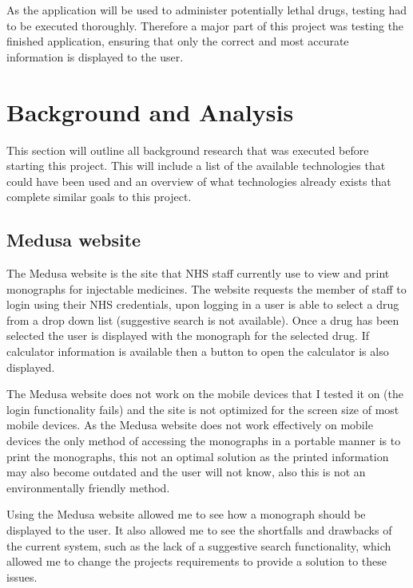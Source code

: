 As the application will be used to administer potentially lethal drugs, testing had to be executed thoroughly. Therefore a major part of this project was testing the finished application, ensuring that only the correct and most accurate information is displayed to the user.


\section{Background and Analysis}

This section will outline all background research that was executed before starting this project. This will include a list of the available technologies that could have been used and an overview of what technologies already exists that complete similar goals to this project.

\subsection{Medusa website}

The Medusa \cite{medusa} website is the site that NHS staff currently use to view and print monographs for injectable medicines. The website requests the member of staff to login using their NHS credentials, upon logging in a user is able to select a drug from a drop down list (suggestive search is not available). Once a drug has been selected the user is displayed with the monograph \cite{monograph} for the selected drug. If calculator information is available then a button to open the calculator is also displayed.

The Medusa website \cite{medusa} does not work on the mobile devices that I tested it on (the login functionality fails) and the site is not optimized for the screen size of most mobile devices. As the Medusa website \cite{medusa} does not work effectively on mobile devices the only method of accessing the monographs \cite{monograph} in a portable manner is to print the monographs, this not an optimal solution as the printed information may also become outdated and the user will not know, also this is not an environmentally friendly method.

Using the Medusa website \cite{medusa} allowed me to see how a monograph \cite{monograph} should be displayed to the user. It also allowed me to see the shortfalls and drawbacks of the current system, such as the lack of a suggestive search functionality, which allowed me to change the projects requirements to provide a solution to these issues.

